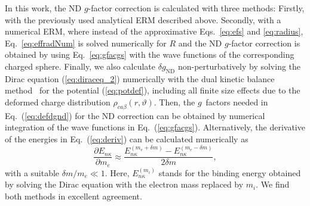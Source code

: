 In this work, the ND $g$-factor correction is calculated with three methods:
Firstly, with the previously used analytical ERM described above. Secondly, with a numerical ERM, where instead of the approximative Eqs.~\eqref{eq:efs} and \eqref{eq:radius}, Eq.~\eqref{eq:effradNum} is solved numerically for $R$ and the ND $g$-factor correction is obtained by using Eq.~\eqref{eq:gfacgs} with the wave functions of the corresponding charged sphere.
Finally, we also calculate $\delta g_{\text{ND}}$ non-perturbatively by solving the Dirac equation (\ref{eq:diraceq_2}) numerically with the dual kinetic balance method~\cite{dualkinetic} for the potential (\ref{eq:potdef}), including all finite size effects due to the deformed charge distribution $\rho_{ca\beta}(r,\vartheta)$. Then, the $g$~factors needed in Eq.~(\ref{eq:defdgnd}) for the ND correction can be obtained by numerical integration of the wave functions in Eq.~(\ref{eq:gfacgs}). Alternatively, the derivative of the energies in Eq.~(\ref{eq:deriv}) can be calculated numerically as 
\begin{equation}
\frac{\partial E_{n\kappa}}{\partial m_e} \approx \frac{E_{n\kappa}^{(m_e+\delta m)}-E_{n\kappa}^{(m_e-\delta m)}}{2 \delta m},
\end{equation}
with a suitable ${\delta m / m_e}{\ll}{1}$. Here, $E_{n\kappa}^{(m_i)}$ stands for the binding energy obtained by solving the Dirac equation with the electron mass replaced by $m_i$. We find both methods in excellent agreement.

